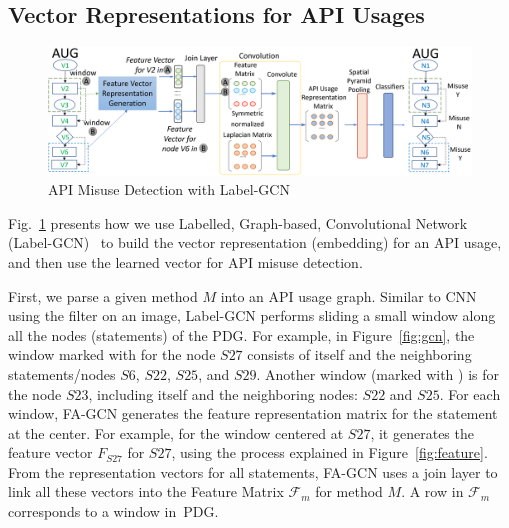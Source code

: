 \subsection{Vector Representations for API Usages}

\begin{figure}[t]
\begin{center}
\includegraphics[width=5.6in]{gcn-detection.png}
\vspace{-5pt}
\caption{API Misuse Detection with Label-GCN}
\label{fig:gcn-detection}
\end{center}
\end{figure}

Fig.~\ref{fig:gcn-detection} presents how we use Labelled,
Graph-based, Convolutional Network (Label-GCN)~\cite{label-gcn} to
build the vector representation (embedding) for an API usage, and then
use the learned vector for API misuse detection.

First, we parse a given method $M$ into an API usage graph. Similar to
CNN using the filter on an image, Label-GCN performs sliding a small
window along all the nodes (statements) of the PDG. For example, in
Figure~\ref{fig:gcn}, the window marked with  for the node
$S27$ consists of itself and the neighboring statements/nodes $S6$,
$S22$, $S25$, and $S29$. Another window (marked with ) is
for the node $S23$, including itself and the neighboring nodes: $S22$
and $S25$. For each window, FA-GCN generates the feature
representation matrix for the statement at the center. For example,
for the window centered at $S27$, it generates the feature vector
$F_{S27}$ for $S27$, using the process explained in
Figure~\ref{fig:feature}. From the representation vectors for all
statements, FA-GCN uses a join layer to link all these vectors into
the Feature Matrix $\mathcal{F}_{m}$ for method $M$. A row in
$\mathcal{F}_m$ corresponds to a window in~PDG.

